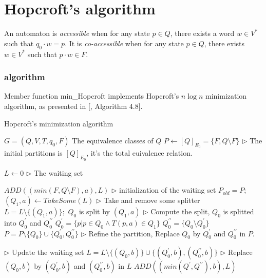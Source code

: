 \chapter{Hopcroft's algorithm}

An automaton is \textit{accessible} when for any state $p\in Q$, there exists a word $w\in V^\ast$ such that $q_0\cdot w=p$. It is \textit{co-accessible} when for any state $p\in Q$, there exists $w\in V^\ast$ such that $p\cdot w\in F$.

\subsection{algorithm}

Member function min\_Hopcroft implements Hopcroft's $n\log n$ minimization algorithm, as presented in [\cite{WATSON94b}, Algorithm 4.8].

\begin{algorithm}  
	\caption{Hopcroft's minimization algorithm}  \label{alg:hopcroft}
	\begin{algorithmic}[1] %
		\Require $G =(Q,V,T,q_0,F)$  
		\Ensure The equivalence classes of $Q$  
		\State $P \gets [Q]_{E_0}=\{F,Q\setminus F \}$  \qquad\qquad $\triangleright$ The initial partitions is $[Q]_{E_0}$, it's the total euivalence relation.
		
		\State $L \gets 0$  \qquad\qquad $\triangleright$ The waiting set
		
			\State $ADD((min(F,Q\setminus F),a),L)$ \qquad\qquad 			$\triangleright$ initialization of the waiting set
		\EndFor
			\State $P_{old} = P;$
			\State $(Q_1,a)\gets TakeSome(L)$ \qquad\qquad $\triangleright$ Take and remove some splitter
			\State $L=L\setminus \{(Q_1,a)\};$
				\State $Q_0$ is split by $(Q_1,a)$  \qquad\qquad $\triangleright$ Compute the split, $Q_0$ is splitted into $Q_0^\prime$ and $Q_0^{\prime\prime}$
				\State $Q_0^{\prime}=\{p|p\in Q_0\land T(p,a)\in Q_1\}$ 
				\State $Q_0^{\prime\prime}=\{Q_0\setminus Q_0^\prime\}$
				\State $P=P\setminus \{Q_0\}\cup\{Q_0^\prime, Q_0^{\prime\prime}\}$ \qquad\qquad $\triangleright$ Refine the partition, Replace $Q_0$ by $Q_0^\prime$ and $Q_0^{\prime\prime}$ in $P$.
			
				  \qquad\qquad $\triangleright$ Update the waiting set
						\State $L=L\setminus \{(Q_0,b)\}\cup\{(Q_0^\prime,b),(Q_0^{\prime\prime},b)\} $ \qquad\qquad $\triangleright$ Replace $(Q_0, b)$ by $(Q_0^\prime, b)$ and $(Q_0^{\prime\prime}, b)$ in $L$
					\Else
						\State $ADD((min(Q^\prime,Q^{\prime\prime}),b),L)$
						\EndIf  
				\EndFor
			\EndFor 
		\EndWhile
	\end{algorithmic}
\end{algorithm}

